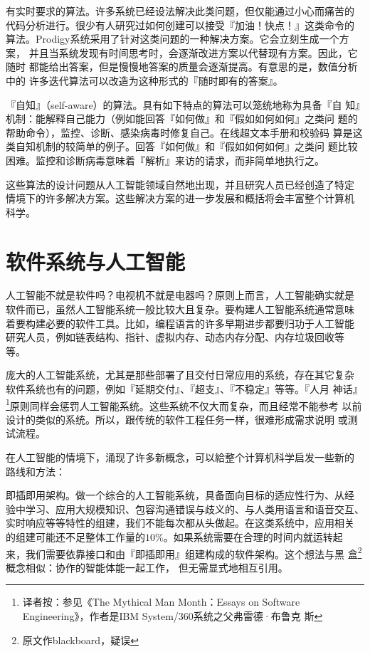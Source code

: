 \documentclass[12pt,a4paper]{article}
\begin{document}
有实时要求的算法。许多系统已经设法解决此类问题，但仅能通过小心而痛苦的
代码分析进行。很少有人研究过如何创建可以接受『加油！快点！』这类命令的
算法。Prodigy系统采用了针对这类问题的一种解决方案。它会立刻生成一个方案，
并且当系统发现有时间思考时，会逐渐改进方案以代替现有方案。因此，它随时
都能给出答案，但是慢慢地答案的质量会逐渐提高。有意思的是，数值分析中的
许多迭代算法可以改造为这种形式的『随时即有的答案』。

『自知』（self-aware）的算法。具有如下特点的算法可以笼统地称为具备『自
知』机制：能解释自己能力（例如能回答『如何做』和『假如如何如何』之类问
题的帮助命令），监控、诊断、感染病毒时修复自己。在线超文本手册和校验码
算是这类自知机制的较简单的例子。回答『如何做』和『假如如何如何』之类问
题比较困难。监控和诊断病毒意味着『解析』来访的请求，而非简单地执行之。

这些算法的设计问题从人工智能领域自然地出现，并且研究人员已经创造了特定
情境下的许多解决方案。这些解决方案的进一步发展和概括将会丰富整个计算机
科学。

\section{软件系统与人工智能}

人工智能不就是软件吗？电视机不就是电器吗？原则上而言，人工智能确实就是
软件而已，虽然人工智能系统一般比较大且复杂。要构建人工智能系统通常意味
着要构建必要的软件工具。比如，编程语言的许多早期进步都要归功于人工智能
研究人员，例如链表结构、指针、虚拟内存、动态内存分配、内存垃圾回收等
等。

庞大的人工智能系统，尤其是那些部署了且交付日常应用的系统，存在其它复杂
软件系统也有的问题，例如『延期交付』、『超支』、『不稳定』等等。『人月
神话』\footnote{译者按：参见《The Mythical Man Month：Essays on
  Software Engineering》，作者是IBM System/360系统之父弗雷德·布鲁克
  斯}原则同样会惩罚人工智能系统。这些系统不仅大而复杂，而且经常不能参考
以前设计的类似的系统。所以，跟传统的软件工程任务一样，很难形成需求说明
或测试流程。

在人工智能的情境下，涌现了许多新概念，可以給整个计算机科学启发一些新的
路线和方法：

即插即用架构。做一个综合的人工智能系统，具备面向目标的适应性行为、从经
验中学习、应用大规模知识、包容沟通错误与歧义的、与人类用语言和语音交互、
实时响应等等特性的组建，我们不能每次都从头做起。在这类系统中，应用相关
的组建可能还不足整体工作量的$10\%$。如果系统需要在合理的时间内就运转起
来，我们需要依靠接口和由『即插即用』组建构成的软件架构。这个想法与黑
盒\footnote{原文作blackboard，疑误} 概念相似：协作的智能体能一起工作，
但无需显式地相互引用。
\end{document}
